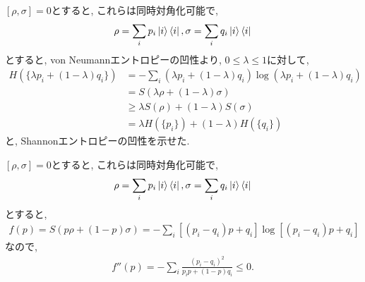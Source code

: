 \begin{ex}
    \label{ex11.20}
\end{ex}

\begin{ex}
    \label{ex11.21}
    $[ \rho , \sigma] = 0$とすると, これらは同時対角化可能で,
    \begin{align*}
        \rho = \sum_i p_i \ket{i} \bra{i},
        \sigma = \sum_i q_i \ket{i} \bra{i}
    \end{align*}
    とすると, von Neumannエントロピーの凹性より, $0 \le \lambda \le 1$に対して,
    \begin{align*}
        H( \{ \lambda p_i + (1 - \lambda) q_i\})
         & =
        - \sum_{i} \left( \lambda p_i + (1 - \lambda) q_i \right) \log \left( \lambda p_i + (1 - \lambda) q_i \right)
        \\
         & =S( \lambda \rho + (1 - \lambda) \sigma)
        \\
         & \geq
        \lambda S (\rho) + (1- \lambda) S(\sigma)
        \\
         & =
        \lambda H (\{ p_i \}) + (1- \lambda) H(\{ q_i\})
    \end{align*}
    と, Shannonエントロピーの凹性を示せた.
\end{ex}

\begin{ex}
    \label{ex11.22}
    $[ \rho , \sigma] = 0$とすると, これらは同時対角化可能で,
    \begin{align*}
        \rho = \sum_i p_i \ket{i} \bra{i},
        \sigma = \sum_i q_i \ket{i} \bra{i}
    \end{align*}
    とすると,
    \begin{align*}
        f(p)
        = S(p \rho + (1-p)\sigma)
        = - \sum_i
        \left[ \left( p_i - q_i \right) p + q_i \right]
        \log \left[  \left( p_i - q_i \right) p + q_i \right]
    \end{align*}
    なので, 
    \begin{align*}
        f''(p) = - \sum_i \frac{ (p_i - q_i)^2 }{p_i p + (1-p)q_i} \leq 0.
    \end{align*}
\end{ex}